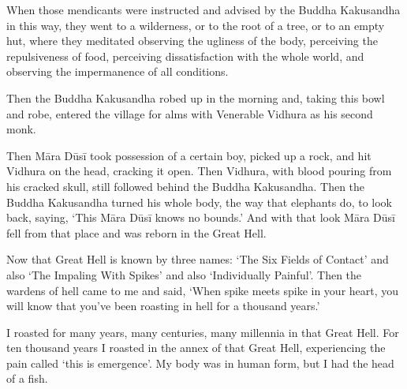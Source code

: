 \documentclass[12pt,openany]{book}%
\begin{document}
When those mendicants were instructed and advised by the Buddha Kakusandha in this way, they went to a wilderness, or to the root of a tree, or to an empty hut, where they meditated observing the ugliness of the body, perceiving the repulsiveness of food, perceiving dissatisfaction with the whole world, and observing the impermanence of all conditions. 

Then the Buddha Kakusandha robed up in the morning and, taking this bowl and robe, entered the village for alms with Venerable Vidhura as his second monk. 

Then \textsanskrit{Māra} \textsanskrit{Dūsī} took possession of a certain boy, picked up a rock, and hit Vidhura on the head, cracking it open. Then Vidhura, with blood pouring from his cracked skull, still followed behind the Buddha Kakusandha. Then the Buddha Kakusandha turned his whole body, the way that elephants do, to look back, saying, ‘This \textsanskrit{Māra} \textsanskrit{Dūsī} knows no bounds.’ And with that look \textsanskrit{Māra} \textsanskrit{Dūsī} fell from that place and was reborn in the Great Hell. 

Now that Great Hell is known by three names: ‘The Six Fields of Contact’ and also ‘The Impaling With Spikes’ and also ‘Individually Painful’. Then the wardens of hell came to me and said, ‘When spike meets spike in your heart, you will know that you’ve been roasting in hell for a thousand years.’ 

I roasted for many years, many centuries, many millennia in that Great Hell. For ten thousand years I roasted in the annex of that Great Hell, experiencing the pain called ‘this is emergence’. My body was in human form, but I had the head of a fish. 
\end{document}
